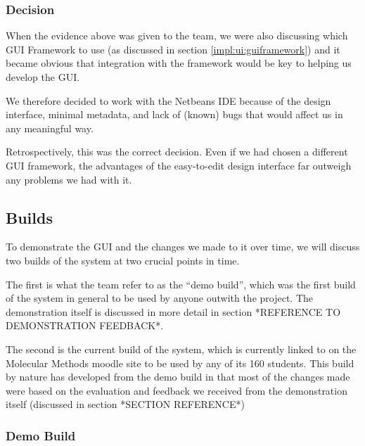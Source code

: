 \subsubsection{Decision}
\label{impl:ui:ide:decision}

When the evidence above was given to the team, we were also discussing
which GUI Framework to use (as discussed in section
\ref{impl:ui:guiframework}) and it became obvious that integration
with the framework would be key to helping us develop the GUI.

We therefore decided to work with the Netbeans IDE because of the
design interface, minimal metadata, and lack of (known) bugs that
would affect us in any meaningful way.

Retrospectively, this was the correct decision.
Even if we had chosen a different GUI framework, the advantages of the
easy-to-edit design interface far outweigh any problems we had with
it.

\subsection{Builds}
\label{impl:ui:builds}

To demonstrate the GUI and the changes we made to it over time, we
will discuss two builds of the system at two crucial points in time.

The first is what the team refer to as the ``demo build'', which was
the first build of the system in general to be used by anyone outwith
the project.
The demonstration itself is discussed in more detail in section
*REFERENCE TO DEMONSTRATION FEEDBACK*.

The second is the current build of the system, which is currently
linked to on the Molecular Methods moodle site to be used by any of
its 160 students.
This build by nature has developed from the demo build in that most of
the changes made were based on the evaluation and feedback we received
from the demonstration itself (discussed in section *SECTION
REFERENCE*)

\subsubsection{Demo Build}

